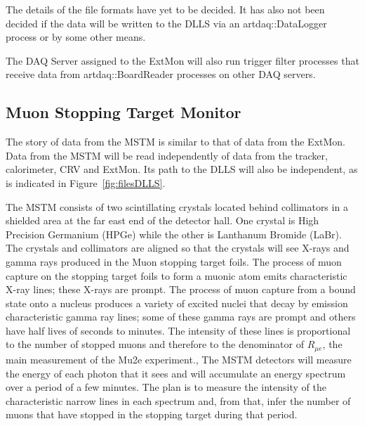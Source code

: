 The details of the file formats have yet to be decided.
It has also not been decided if the data will be written to the DLLS
via an {\code artdaq::DataLogger} process
or by some other means.

\begin{sloppypar}
The DAQ Server assigned to the ExtMon will also run trigger filter processes that receive
data from {\code artdaq::BoardReader} processes on other DAQ servers.
\end{sloppypar}




\subsection{Muon Stopping Target Monitor}
\label{ssec:MSTM}

The story of data from the MSTM is similar to that of data from the ExtMon.
Data from the MSTM  will be read independently of data
from the tracker, calorimeter, CRV and ExtMon.
Its path to the DLLS will also be independent, as is indicated in Figure~\ref{fig:filesDLLS}.

The MSTM consists of two scintillating crystals located behind collimators in a shielded area
at the far east end of the detector hall.
One crystal is High Precision Germanium (HPGe) while the other is Lanthanum Bromide (LaBr).
The crystals and collimators are aligned so that the crystals will see X-rays and gamma rays
produced in the Muon stopping target foils.
The process of muon capture on the stopping target foils to form a muonic atom
emits characteristic X-ray lines; these X-rays are prompt.
The process of muon capture from a bound state onto a nucleus produces
a variety of excited nuclei that decay by emission characteristic gamma ray lines;
some of these gamma rays are prompt and others have half lives of seconds to minutes.
The intensity of these lines is proportional to the number of stopped muons and therefore
to the denominator of $R_{\mu e}$, the main measurement of the Mu2e experiment.,
The MSTM detectors will measure the energy of each photon that it sees
and will accumulate an energy spectrum over a period of a few minutes.
The plan is to measure the intensity of the characteristic narrow lines in each spectrum and,
from that, infer the number of muons that have stopped in the stopping target during
that period.

